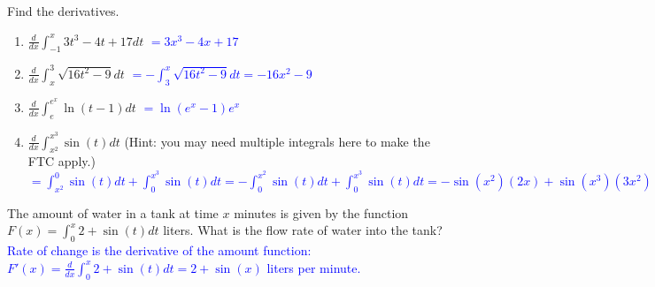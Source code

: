 \documentclass{ximera}
\begin{document}
\begin{exercise}
    Find the derivatives.
    \begin{enumerate}
        \item $\frac{d}{dx}\int_{-1}^x 3t^3-4t+17dt$ \textcolor{blue}{$=3x^3-4x+17$}
        \item $\frac{d}{dx}\int_x^3 \sqrt{16t^2-9}dt$ \textcolor{blue}{$=-\int_3^x\sqrt{16t^2-9}dt=-16x^2-9$}
        \item $\frac{d}{dx}\int_e^{e^x} \ln(t-1)dt$ \textcolor{blue}{$=\ln(e^x-1)e^x$}
        \item $\frac{d}{dx}\int_{x^2}^{x^3} \sin(t)dt$ (Hint: you may need multiple integrals here to make the FTC apply.)\\
        \textcolor{blue}{$=\int_{x^2}^0 \sin(t)dt+\int_0^{x^3}\sin(t)dt=-\int_0^{x^2}\sin(t)dt+\int_0^{x^3}\sin(t)dt=-\sin(x^2)(2x)+\sin(x^3)(3x^2)$}
    \end{enumerate}
\end{exercise}

\begin{exercise}
    The amount of water in a tank at time $x$ minutes is given by the function $F(x)=\int_0^x 2+\sin(t)dt$ liters.  What is the flow rate of water into the tank? \\
    \textcolor{blue}{Rate of change is the derivative of the amount function: $F'(x)=\frac{d}{dx}\int_0^x 2+\sin(t)dt=2+\sin(x)$ liters per minute.}
\end{exercise}
\end{document}
